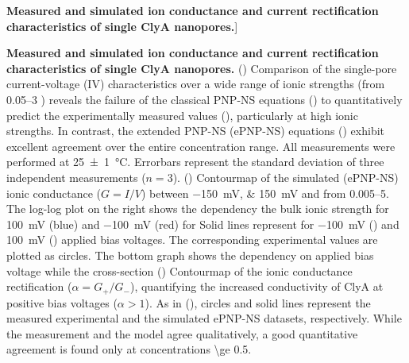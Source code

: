 \begin{figure*}[htbp]
\caption
[\textbf{Measured and simulated ion conductance and current rectification characteristics of single ClyA 
nanopores.}]
{
\textbf{Measured and simulated ion conductance and current rectification characteristics of single ClyA 
nanopores.}
()
Comparison of the single-pore current-voltage (IV) characteristics over a wide range of ionic strengths (from 
\SIrange{0.05}{3}{\Molar} ) reveals the failure of the classical PNP-NS equations 
() to quantitatively predict the experimentally measured values  
(), particularly at high ionic strengths. In contrast, the extended PNP-NS  
(ePNP-NS) equations () exhibit excellent agreement over the entire 
concentration range. All measurements were performed at \SI{25\pm1}{\degreeCelsius}. Errorbars represent the 
standard deviation of three independent measurements ($n=3$).
()
Contourmap of the simulated (ePNP-NS) ionic conductance ($G = I / V$) between \SIlist{-150;150}{\milli\volt} 
and from \SIrange{0.005}{5}{\Molar}. The log-log plot on the right shows the dependency the bulk ionic 
strength for \SI{+100}{\milli\volt} (blue) and \SI{-100}{\milli\volt} (red) for Solid lines represent for 
\SI{-100}{\milli\volt} () and \SI{+100}{\milli\volt} 
() applied bias voltages. The corresponding experimental values are plotted as 
circles. The bottom graph shows the dependency on applied bias voltage while the cross-section
()
Contourmap of the ionic conductance rectification ($\alpha = G_+ / G_-$), quantifying the increased 
conductivity of ClyA at positive bias voltages ($\alpha > 1$). As in 
(), circles and solid lines represent the measured experimental and 
the simulated ePNP-NS datasets, respectively. While the measurement and the model agree qualitatively, a 
good quantitative agreement is found only at concentrations \SI{\ge 0.5}{\Molar}.



}
\end{figure*}
